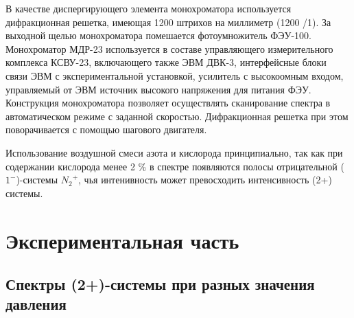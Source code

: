 \documentclass[a4paper,12pt]{article}
\begin{document}
В качестве диспергирующего элемента монохроматора используется дифракционная
решетка, имеющая 1200 штрихов на миллиметр (1200 /1). За выходной щелью
монохроматора помешается фотоумножитель ФЭУ-100. Монохроматор МДР-23
используется в составе управляющего измерительного комплекса КСВУ-23, включающего
также ЭВМ ДВК-3, интерфейсные блоки связи ЭВМ с экспериментальной установкой,
усилитель с высокоомным входом, управляемый от ЭВМ источник высокого напряжения
для питания ФЭУ. Конструкция монохроматора позволяет осуществлять сканирование
спектра в автоматическом режиме с заданной скоростью. Дифракционная решетка при
этом поворачивается с помощью шагового двигателя.


Использование воздушной смеси азота и кислорода принципиально, так как при содержании кислорода менее 2 \% в спектре появляются полосы отрицательной ($1^{-}$)-системы ${N_2}^+$, чья интенивность может превосходить интенсивность (2+) системы.  


\newpage
	
	\section{Экспериментальная часть}
	
	\subsection{Спектры (2+)-системы при разных значения давления}
	
\end{document}
